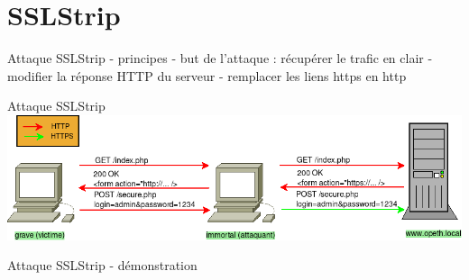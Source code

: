 \section{SSLStrip}


\begin{frame}{Attaque SSLStrip - principes}
  - but de l'attaque : récupérer le trafic en clair
  - modifier la réponse HTTP du serveur
  - remplacer les liens https en http

\end{frame}


\begin{frame}{Attaque SSLStrip}
    \includegraphics[width=\linewidth]{../medias/sslstrip/attack.png}
\end{frame}


\begin{frame}{Attaque SSLStrip - démonstration}
\end{frame}
